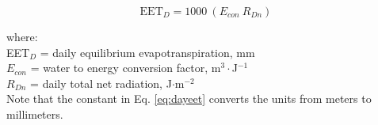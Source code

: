 \begin{equation}
\label{eq:dayeet}
	\text{EET}_D = 1000\: \left(E_{con}\: R_{Dn}\right)
\end{equation}

\noindent where:\\
\indent EET$_D$ = daily equilibrium evapotranspiration, mm\\
\indent $E_{con}$ = water to energy conversion factor, m$^{3}\cdot$J$^{-1}$\\
\indent $R_{Dn}$ = daily total net radiation, J$\cdot$m$^{-2}$ \\

\noindent Note that the constant in Eq. \ref{eq:dayeet} converts the units from meters to millimeters.

